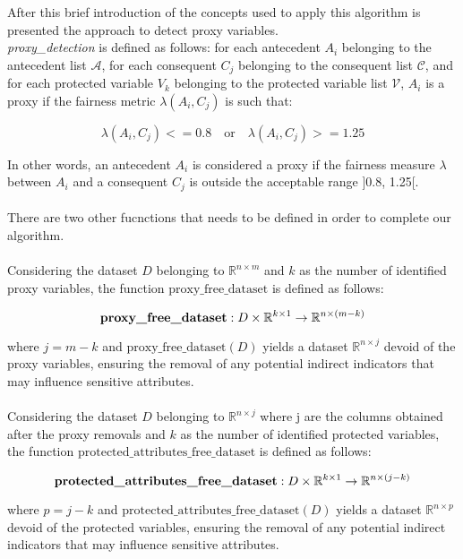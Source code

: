 \documentclass[12pt,a4paper,openright,twoside]{book}
\begin{document}
After this brief introduction of the concepts used to apply this algorithm is presented the approach to detect proxy variables. \\
\textit{proxy\_detection} is defined as follows: for each antecedent \( A_i \) belonging to the antecedent list \( \mathcal{A} \), for each consequent \( C_j \) belonging to the consequent list \( \mathcal{C} \), and for each protected variable \( V_k \) belonging to the protected variable list \( \mathcal{V} \), \( A_i \) is a proxy if the fairness metric \( \lambda(A_i, C_j) \) is such that:

\[\lambda(A_i, C_j) <= 0.8 \quad \text{or} \quad \lambda(A_i, C_j) >= 1.25\]

In other words, an antecedent \( A_i \) is considered a proxy if the fairness measure \( \lambda \) between \( A_i \) and a consequent \( C_j \) is outside the acceptable range ]0.8, 1.25[.
\\
\\
There are two other fucnctions that needs to be defined in order to complete our algorithm.
\\
\\
Considering the dataset \( D \) belonging to \( \mathbb{R}^{n \times m} \) and \( k \) as the number of identified proxy variables, the function \( \text{proxy\_free\_dataset} \) is defined as follows:

\[
\text{\textbf{proxy\_free\_dataset}}: D \times \mathbb{R}^{k \times 1} \rightarrow \mathbb{R}^{n \times (m - k)}
\]

where \( j = m - k \) and \( \text{proxy\_free\_dataset}(D) \) yields a dataset \( \mathbb{R}^{n \times j} \) devoid of the proxy variables, ensuring the removal of any potential indirect indicators that may influence sensitive attributes. \\
\\
Considering the dataset \( D \) belonging to \( \mathbb{R}^{n \times j} \) where j are the columns obtained after the proxy removals and \( k \) as the number of identified protected variables, the function \( \text{protected\_attributes\_free\_dataset} \) is defined as follows:

\[
\text{\textbf{protected\_attributes\_free\_dataset}}: D \times \mathbb{R}^{k \times 1} \rightarrow \mathbb{R}^{n \times (j - k)}
\]

where \( p = j - k \) and \( \text{protected\_attributes\_free\_dataset}(D) \) yields a dataset \( \mathbb{R}^{n \times p} \) devoid of the protected variables, ensuring the removal of any potential indirect indicators that may influence sensitive attributes.
\end{document}
